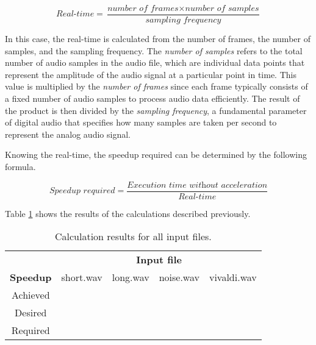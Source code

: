 \begin{equation}
    \textit{Real-time} = \frac{\textit{number of frames} \times \textit{number of samples}}{\textit{sampling frequency}} 
\end{equation}

In this case, the real-time is calculated from the number of frames, the number of samples, and the sampling frequency.
The \textit{number of samples} refers to the total number of audio samples in the audio file, which are individual data points that represent the amplitude of the audio signal at a particular point in time. This value is multiplied by the \textit{number of frames} since each frame typically consists of a fixed number of audio samples to process audio data efficiently. The result of the product is then divided by the \textit{sampling frequency}, a fundamental parameter of digital audio that specifies how many samples are taken per second to represent the analog audio signal.

Knowing the real-time, the speedup required can be determined by the following formula.

\begin{equation}
    \textit{Speedup required} = \frac{\textit{Execution time without acceleration}}{\textit{Real-time}} 
\end{equation}

Table \ref{speedup} shows the results of the calculations described previously.

\vspace{1cm}

\begin{table}[H]
    \centering
    \begin{tabular}{c|c|c|c|c|}
    \cline{2-5}
    \multicolumn{1}{c|}{}  & \multicolumn{4}{c|}{\textbf{Input file}} \\
    \cline{1-5}
    \multicolumn{1}{|c|}{\textbf{Speedup}} & short.wav & long.wav & noise.wav & vivaldi.wav \\
    \hline
    \multicolumn{1}{|c|}{Achieved} &  &  &  &  \\ 
    \hline
    \multicolumn{1}{|c|}{Desired}  &  &  &   &  \\ 
    \hline
    \multicolumn{1}{|c|}{Required}  &  &  &  &  \\ 
    \hline
    \end{tabular}
    \caption{Calculation results for all input files.}
    \label{speedup}
\end{table}